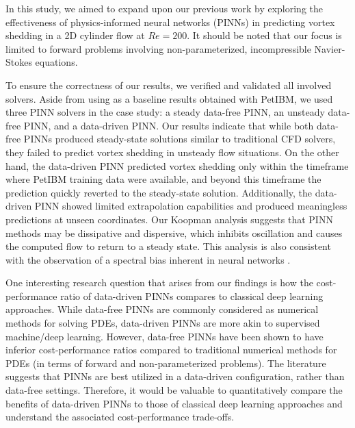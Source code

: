 
In this study, we aimed to expand upon our previous work \cite{chuang_experience_2022} by exploring the effectiveness of physics-informed neural networks (PINNs) in predicting vortex shedding in a 2D cylinder flow at $Re = 200$.
It should be noted that our focus is limited to forward problems involving non-parameterized, incompressible Navier-Stokes equations.

To ensure the correctness of our results, we verified and validated all involved solvers.
Aside from using as a baseline results obtained with PetIBM, we used three PINN solvers in the case study: a steady data-free PINN, an unsteady data-free PINN, and a data-driven PINN.
Our results indicate that while both data-free PINNs produced steady-state solutions similar to traditional CFD solvers, they failed to predict vortex shedding in unsteady flow situations.
On the other hand, the data-driven PINN predicted vortex shedding only within the timeframe where PetIBM training data were available, and beyond this timeframe the prediction quickly reverted to the steady-state solution.
Additionally, the data-driven PINN showed limited extrapolation capabilities and produced meaningless predictions at unseen coordinates.
Our Koopman analysis suggests that PINN methods may be dissipative and dispersive, which inhibits oscillation and causes the computed flow to return to a steady state.
This analysis is also consistent with the observation of a spectral bias inherent in neural networks \cite{rahaman_spectral_2019}.

One interesting research question that arises from our findings is how the cost-performance ratio of data-driven PINNs compares to classical deep learning approaches.
While data-free PINNs are commonly considered as numerical methods for solving PDEs, data-driven PINNs are more akin to supervised machine/deep learning.
However, data-free PINNs have been shown to have inferior cost-performance ratios compared to traditional numerical methods for PDEs (in terms of forward and non-parameterized problems).
The literature suggests that PINNs are best utilized in a data-driven configuration, rather than data-free settings.
Therefore, it would be valuable to quantitatively compare the benefits of data-driven PINNs to those of classical deep learning approaches and understand the associated cost-performance trade-offs.

